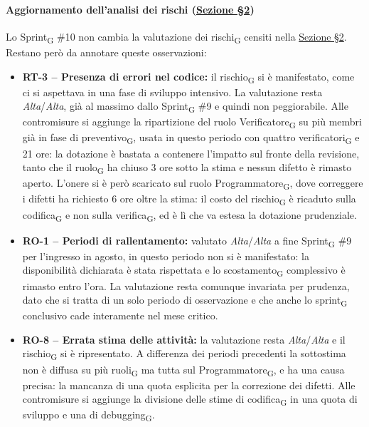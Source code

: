 ﻿\documentclass[a4paper, 10pt, colorlinks=true, linkcolor=black, urlcolor=blue, citecolor=blue, hidelinks]{article}
\begin{document}
\paragraph{Aggiornamento dell'analisi dei rischi (\hyperref[tab:gestione-rischi]{Sezione \S2})}
Lo Sprint\textsubscript{G} \#10 non cambia la valutazione dei rischi\textsubscript{G} censiti nella \hyperref[tab:gestione-rischi]{Sezione \S2}. Restano però da annotare queste osservazioni:
\begin{itemize}
    \item \textbf{RT-3 -- Presenza di errori nel codice:} il rischio\textsubscript{G} si è manifestato, come ci si aspettava in una fase di sviluppo intensivo. La valutazione resta \textit{Alta}/\textit{Alta}, già al massimo dallo Sprint\textsubscript{G} \#9 e quindi non peggiorabile. Alle contromisure si aggiunge la ripartizione del ruolo Verificatore\textsubscript{G} su più membri già in fase di preventivo\textsubscript{G}, usata in questo periodo con quattro verificatori\textsubscript{G} e 21 ore: la dotazione è bastata a contenere l'impatto sul fronte della revisione, tanto che il ruolo\textsubscript{G} ha chiuso 3 ore sotto la stima e nessun difetto è rimasto aperto. L'onere si è però scaricato sul ruolo Programmatore\textsubscript{G}, dove correggere i difetti ha richiesto 6 ore oltre la stima: il costo del rischio\textsubscript{G} è ricaduto sulla codifica\textsubscript{G} e non sulla verifica\textsubscript{G}, ed è lì che va estesa la dotazione prudenziale.

    \item \textbf{RO-1 -- Periodi di rallentamento:} valutato \textit{Alta}/\textit{Alta} a fine Sprint\textsubscript{G} \#9 per l'ingresso in agosto, in questo periodo non si è manifestato: la disponibilità dichiarata è stata rispettata e lo scostamento\textsubscript{G} complessivo è rimasto entro l'ora. La valutazione resta comunque invariata per prudenza, dato che si tratta di un solo periodo di osservazione e che anche lo sprint\textsubscript{G} conclusivo cade interamente nel mese critico.

    \item \textbf{RO-8 -- Errata stima delle attività:} la valutazione resta \textit{Alta}/\textit{Alta} e il rischio\textsubscript{G} si è ripresentato. A differenza dei periodi precedenti la sottostima non è diffusa su più ruoli\textsubscript{G} ma tutta sul Programmatore\textsubscript{G}, e ha una causa precisa: la mancanza di una quota esplicita per la correzione dei difetti. Alle contromisure si aggiunge la divisione delle stime di codifica\textsubscript{G} in una quota di sviluppo e una di debugging\textsubscript{G}.
\end{itemize}
\end{document}
